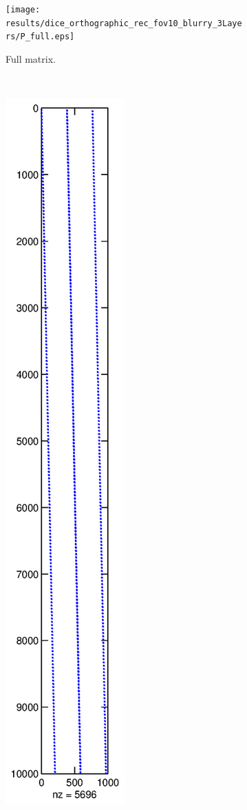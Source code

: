 \documentclass[11pt,a4paper,titlepage]{article}
\begin{document}
\begin{figure}[h]
	\centering
	\begin{subfigure}[c]{\textwidth}
 		\texttt{[image: results/dice\_orthographic\_rec\_fov10\_blurry\_3Layers/P\_full.eps]}
  		\caption{Full matrix.}
   		\label{fig:P_orthographic_full}
	\end{subfigure}%
	\\
	\begin{subfigure}[c]{\textwidth}
		\includegraphics[width=\textwidth]{results/dice_orthographic_rec_fov10_blurry_3Layers/P1-10000_1-1000.eps}

\end{subfigure}
\end{figure}
\end{document}
